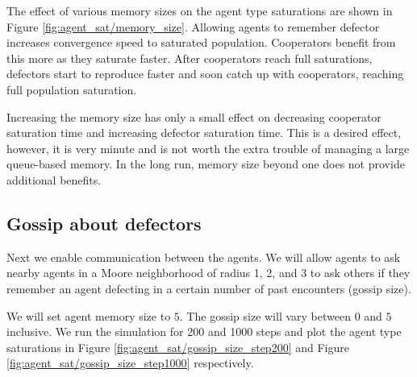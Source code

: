 \documentclass[english]{article}
\begin{document}
The effect of various memory sizes on the agent type saturations are shown in Figure \ref{fig:agent_sat/memory_size}.
Allowing agents to remember defector increases convergence speed to saturated population.
Cooperators benefit from this more as they saturate faster.
After cooperators reach full saturations, defectors start to reproduce faster and soon catch up with cooperators, reaching full population saturation.

Increasing the memory size has only a small effect on decreasing cooperator saturation time and increasing defector saturation time.
This is a desired effect, however, it is very minute and is not worth the extra trouble of managing a large queue-based memory.
In the long run, memory size beyond one does not provide additional benefits.


\subsection{Gossip about defectors}
Next we enable communication between the agents.
We will allow agents to ask nearby agents in a Moore neighborhood of radius 1, 2, and 3 to ask others if they remember an agent defecting in a certain number of past encounters (gossip size).

We will set agent memory size to $5$.
The gossip size will vary between $0$ and $5$ inclusive.
We run the simulation for 200 and 1000 steps and plot the agent type saturations in Figure \ref{fig:agent_sat/gossip_size_step200} and Figure \ref{fig:agent_sat/gossip_size_step1000} respectively.
\end{document}
